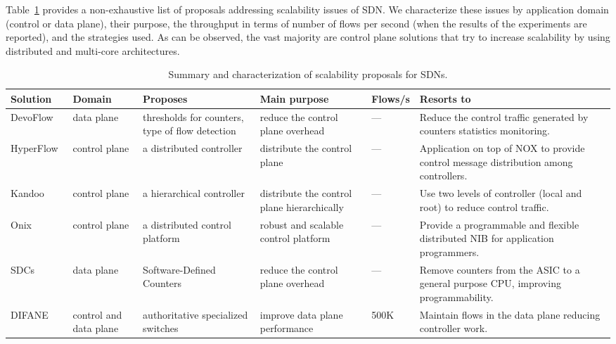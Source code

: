 Table~\ref{tab:scalabilitysolutions} provides a non-exhaustive list of proposals addressing scalability issues of 
SDN. 
We characterize these issues by application domain (control or data plane), their purpose, the throughput in terms of number of flows per second (when the results of the experiments are reported), and the strategies used.
As can be observed, the vast majority are control plane solutions that try to increase scalability by using distributed and multi-core architectures.


{\renewcommand{\arraystretch}{1.4}
\begin{table}[!htp]
\caption{Summary and characterization of scalability proposals for SDNs.}
\label{tab:scalabilitysolutions}
\begin{center}
\footnotesize
\begin{tabularx}{\linewidth}{p{1.9cm}p{1.6cm}p{2.8cm}p{2.5cm}p{1.0cm}X}
\hline
\textbf{Solution} & \textbf{Domain} & \textbf{Proposes} & \textbf{Main purpose} & \textbf{Flows/s} & \textbf{Resorts to} \\\hline
DevoFlow~\cite{curtis2011} & data plane & thresholds for counters, type of flow detection & reduce the control plane overhead & --- & Reduce the control traffic generated by counters statistics monitoring. \\\hline
HyperFlow~\cite{tootoonchian2010} & control plane & a distributed controller & distribute the control plane & --- & Application on top of NOX to provide control message distribution among controllers. \\\hline
Kandoo~\cite{yeganeh2012} & control plane & a hierarchical controller & distribute the control plane hierarchically & --- & Use two levels of controller (local and root) to reduce control traffic. \\\hline
Onix~\cite{koponen-1} & control plane & a distributed control platform & robust and scalable control platform & --- & Provide a programmable and flexible distributed NIB for application programmers.\\\hline
SDCs~\cite{mogul2012} & data plane & Software-Defined Counters & reduce the control plane overhead & --- & Remove counters from the ASIC to a general purpose CPU, improving programmability. \\\hline
DIFANE~\cite{yu2010-1} & control and data plane & authoritative specialized switches & improve data plane performance & 500K & Maintain flows in the data plane reducing controller work. \\\hline

\end{tabularx}
\end{center}
\end{table}}
